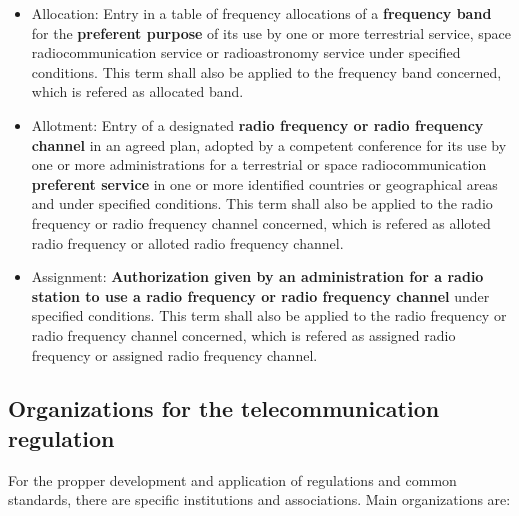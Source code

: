 \documentclass[../main.tex]{subfiles}
\begin{document}
\begin{itemize}
	\item Allocation: Entry in a table of frequency allocations of a \textbf{frequency band} for the \textbf{preferent purpose} of its use by one or more terrestrial service, space radiocommunication service or radioastronomy service under specified conditions. This term shall also be applied to the frequency band concerned, which is refered as allocated band.
	\item Allotment: Entry of a designated \textbf{radio frequency or radio frequency channel} in an agreed plan, adopted by a competent conference for its use by one or more administrations for a terrestrial or space radiocommunication \textbf{preferent service} in one or more identified countries or geographical areas and under specified conditions. This term shall also be applied to the radio frequency or radio frequency channel concerned, which is refered as alloted radio frequency or alloted radio frequency channel.
	\item Assignment: \textbf{Authorization given by an administration for a radio station to use a radio frequency or radio frequency channel} under specified conditions. This term shall also be applied to the radio frequency or radio frequency channel concerned, which is refered as assigned radio frequency or assigned radio frequency channel.
\end{itemize}

\subsection{Organizations for the telecommunication regulation}

For the propper development and application of regulations and common standards, there are specific institutions and associations. Main organizations are:
\end{document}
